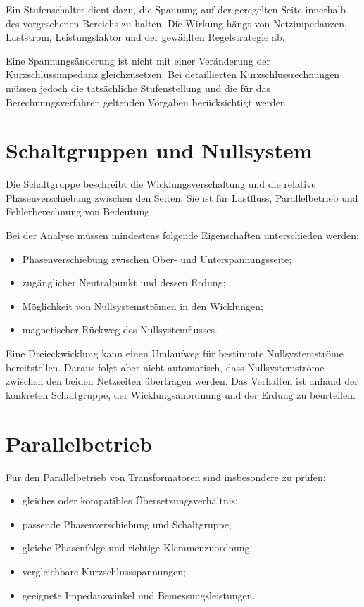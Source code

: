 Ein Stufenschalter dient dazu, die Spannung auf der geregelten Seite
innerhalb des vorgesehenen Bereichs zu halten. Die Wirkung hängt von
Netzimpedanzen, Laststrom, Leistungsfaktor und der gewählten Regelstrategie ab.

Eine Spannungsänderung ist nicht mit einer Veränderung der Kurzschlussimpedanz
gleichzusetzen. Bei detaillierten Kurzschlussrechnungen müssen jedoch die
tatsächliche Stufenstellung und die für das Berechnungsverfahren geltenden
Vorgaben berücksichtigt werden.

\section{Schaltgruppen und Nullsystem}

Die Schaltgruppe beschreibt die Wicklungsverschaltung und die relative
Phasenverschiebung zwischen den Seiten. Sie ist für Lastfluss, Parallelbetrieb
und Fehlerberechnung von Bedeutung.

Bei der Analyse müssen mindestens folgende Eigenschaften unterschieden werden:
\begin{itemize}
  \item Phasenverschiebung zwischen Ober- und Unterspannungsseite;
  \item zugänglicher Neutralpunkt und dessen Erdung;
  \item Möglichkeit von Nullsystemströmen in den Wicklungen;
  \item magnetischer Rückweg des Nullsystemflusses.
\end{itemize}

Eine Dreieckwicklung kann einen Umlaufweg für bestimmte Nullsystemströme
bereitstellen. Daraus folgt aber nicht automatisch, dass Nullsystemströme
zwischen den beiden Netzseiten übertragen werden. Das Verhalten ist anhand
der konkreten Schaltgruppe, der Wicklungsanordnung und der Erdung zu beurteilen.

\section{Parallelbetrieb}

Für den Parallelbetrieb von Transformatoren sind insbesondere zu prüfen:
\begin{itemize}
  \item gleiches oder kompatibles Übersetzungsverhältnis;
  \item passende Phasenverschiebung und Schaltgruppe;
  \item gleiche Phasenfolge und richtige Klemmenzuordnung;
  \item vergleichbare Kurzschlussspannungen;
  \item geeignete Impedanzwinkel und Bemessungsleistungen.
\end{itemize}


